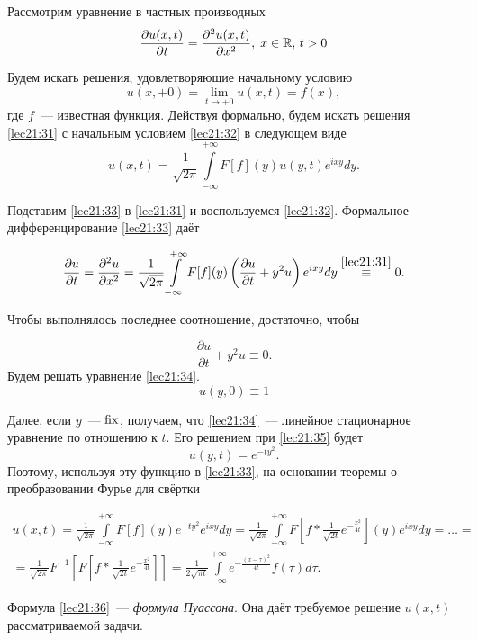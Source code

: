 \documentclass[../../main.tex]{subfiles}
\newcommand{\intii}{\int\limits_{-\infty}^{+\infty}}
\begin{document}
\begin{example}
Рассмотрим уравнение в частных производных
\begin{equation}
\label{lec21:31}
\frac{\partial u(x,t)}{\partial t} = \frac{\partial^2 u(x,t)}{\partial x^2}, 
\; x\in \mathbb{R}, \, t > 0
\end{equation}

Будем искать решения, удовлетворяющие начальному условию
\begin{equation}
  \label{lec21:32}
  u(x,+0) = \lim_{t\to+0} u(x,t) = f(x),
\end{equation}
где $f$~--- известная функция.
Действуя формально, будем искать решения \eqref{lec21:31}  с начальным 
условием \eqref{lec21:32} в следующем виде
\begin{equation}
  \label{lec21:33}
  u(x, t) = \frac{1}{\sqrt{2\pi}} \intii F[f](y)u(y,t)e^{ixy}dy.
\end{equation}

Подставим \eqref{lec21:33} в \eqref{lec21:31} и воспользуемся 
\eqref{lec21:32}. 
Формальное дифференцирование \eqref{lec21:33} даёт

\[\frac{\partial u}{\partial t} = \frac{\partial^2 u}{\partial x^2} = 
\frac{1}{\sqrt{2\pi}} \intii F[f](y)\left(\frac{\partial u}{\partial t} + 
y^2u\right)e^{ixy}dy \stackrel{\eqref{lec21:31}}{\equiv} 0.\]

Чтобы выполнялось последнее соотношение, достаточно, чтобы

\begin{equation}
\label{lec21:34}
\frac{\partial u}{\partial t} + y^2u \equiv 0.
\end{equation}
Будем решать уравнение \eqref{lec21:34}.
\begin{equation}
\label{lec21:35}
u(y,0) \equiv 1
\end{equation}

Далее, если $y$~--- $\operatorname{fix}$, получаем, что \eqref{lec21:34}~--- линейное 
стационарное уравнение по отношению к $t$. Его решением при \eqref{lec21:35} 
будет
\[u(y,t) = e^{-ty^2}.\]
Поэтому, используя эту функцию в \eqref{lec21:33}, на основании теоремы 
о преобразовании Фурье для свёртки

\begin{multline}
  \label{lec21:36}
  u(x,t) = \frac{1}{\sqrt{2\pi}} \intii F[f](y)e^{-ty^2}e^{ixy}dy =
  \frac{1}{\sqrt{2\pi}} \intii F\left[f * 
  \frac{1}{\sqrt{2t}}e^{-\frac{x^2}{4t}}
  \right](y)e^{ixy}dy = \ldots =\\= \frac{1}{\sqrt{2\pi}} 
  F^{-1}\left[F\left[f*\frac{1}{\sqrt{2t}}e^{-\frac{x^2}{4t}}\right]\right] =
  \frac{1}{2\sqrt{\pi t}} \intii e^{-\frac{(x-\tau)^2}{4t}}f(\tau)d\tau.
\end{multline}

Формула \eqref{lec21:36}~--- \emph{формула Пуассона}. Она даёт требуемое 
решение $u(x,t)$ рассматриваемой задачи.
\end{example}
\end{document}
